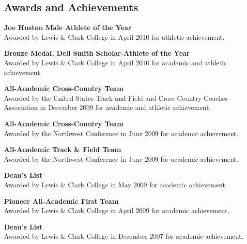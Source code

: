 \documentclass{res}
\begin{document}
\begin{resume}
\section{Awards and Achievements}
    \textbf{Joe Huston Male Athlete of the Year}\\
    Awarded by Lewis \& Clark College in April 2010 for athletic achievement.

    \textbf{Bronze Medal, Dell Smith Scholar-Athlete of the Year}\\
    Awarded by Lewis \& Clark College in April 2010 for academic and athletic
    achievement.

    \textbf{All-Academic Cross-Country Team}\\
    Awarded by the United States Track and Field and Cross-Country Coaches
    Association in December 2009 for academic and athletic achievement.

    \textbf{All-Academic Cross-Country Team}\\
    Awarded by the Northwest Conference in June 2009 for academic achievement.
 
    \textbf{All-Academic Track \& Field Team}\\
    Awarded by the Northwest Conference in June 2009 for academic achievement.
 
    \textbf{Dean's List}\\
    Awarded by Lewis \& Clark College in May 2009 for academic achievement.
 
    \textbf{Pioneer All-Academic First Team}\\
    Awarded by Lewis \& Clark College in April 2009 for academic achievement.
 
    \textbf{Dean's List}\\
    Awarded by Lewis \& Clark College in December 2007 for academic achievement.


\end{resume}
\end{document}
